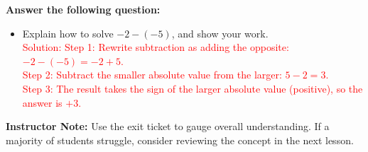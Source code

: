 \documentclass[12pt]{article}
\begin{document}
\vspace{1em}

\begin{tcolorbox}[colframe=black!60, colback=white, 
coltitle=black, colbacktitle=black!15, fonttitle=\bfseries\Large, 
title=Exit Ticket, halign title=center, left=10pt, right=10pt, top=10pt, bottom=15pt]
\textbf{Answer the following question:}
\begin{itemize}
    \item Explain how to solve \( -2 - (-5) \), and show your work. \\
    \textcolor{red}{Solution: Step 1: Rewrite subtraction as adding the opposite: \( -2 - (-5) = -2 + 5 \).\\
    Step 2: Subtract the smaller absolute value from the larger: \( 5 - 2 = 3 \).\\
    Step 3: The result takes the sign of the larger absolute value (positive), so the answer is \( +3 \).}
\end{itemize}

{\color{blue} \textbf{Instructor Note:} Use the exit ticket to gauge overall understanding. If a majority of students struggle, consider reviewing the concept in the next lesson.}
\end{tcolorbox}
\end{document}
